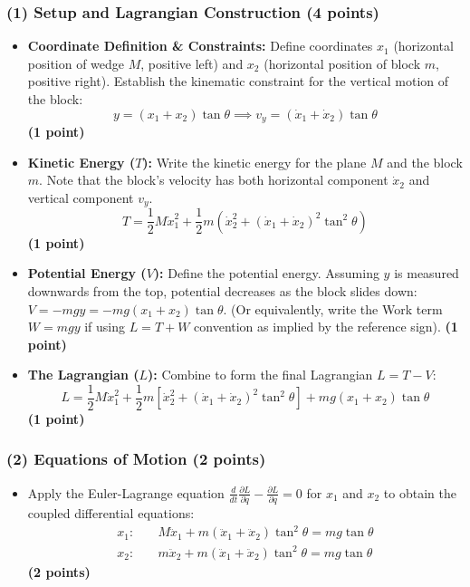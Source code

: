 \documentclass[11pt, a4paper]{article} %
\begin{document}
\subsubsection*{(1) Setup and Lagrangian Construction (4 points)}
\begin{itemize}
    \item \textbf{Coordinate Definition \& Constraints:} 
    Define coordinates $x_1$ (horizontal position of wedge $M$, positive left) and $x_2$ (horizontal position of block $m$, positive right). Establish the kinematic constraint for the vertical motion of the block: 
    \[ y = (x_1 + x_2) \tan \theta \implies v_y = (\dot{x}_1 + \dot{x}_2) \tan \theta \]
    \hfill \textbf{(1 point)}
    
    \item \textbf{Kinetic Energy ($T$):} 
    Write the kinetic energy for the plane $M$ and the block $m$. Note that the block's velocity has both horizontal component $\dot{x}_2$ and vertical component $v_y$.
    \[ T = \frac{1}{2} M \dot{x}_1^2 + \frac{1}{2} m \left( \dot{x}_2^2 + (\dot{x}_1 + \dot{x}_2)^2 \tan^2 \theta \right) \]
    \hfill \textbf{(1 point)}
    
    \item \textbf{Potential Energy ($V$):} 
    Define the potential energy. Assuming $y$ is measured downwards from the top, potential decreases as the block slides down: $V = -mg y = -mg(x_1 + x_2)\tan\theta$. (Or equivalently, write the Work term $W = mg y$ if using $L=T+W$ convention as implied by the reference sign).
    \hfill \textbf{(1 point)}
    
    \item \textbf{The Lagrangian ($L$):} 
    Combine to form the final Lagrangian $L = T - V$:
    \[ L = \frac{1}{2} M \dot{x}_1^2 + \frac{1}{2} m \left[ \dot{x}_2^2 + (\dot{x}_1 + \dot{x}_2)^2 \tan^2 \theta \right] + mg(x_1 + x_2) \tan \theta \]
    \hfill \textbf{(1 point)}
\end{itemize}

\subsubsection*{(2) Equations of Motion (2 points)}
\begin{itemize}
    \item Apply the Euler-Lagrange equation $\frac{d}{dt}\frac{\partial L}{\partial \dot{q}} - \frac{\partial L}{\partial q} = 0$ for $x_1$ and $x_2$ to obtain the coupled differential equations:
    \begin{align*}
        x_1: & \quad M\ddot{x}_1 + m(\ddot{x}_1 + \ddot{x}_2)\tan^2\theta = mg\tan\theta \\
        x_2: & \quad m\ddot{x}_2 + m(\ddot{x}_1 + \ddot{x}_2)\tan^2\theta = mg\tan\theta
    \end{align*}
    \hfill \textbf{(2 points)} \\
\end{itemize}
\end{document}
